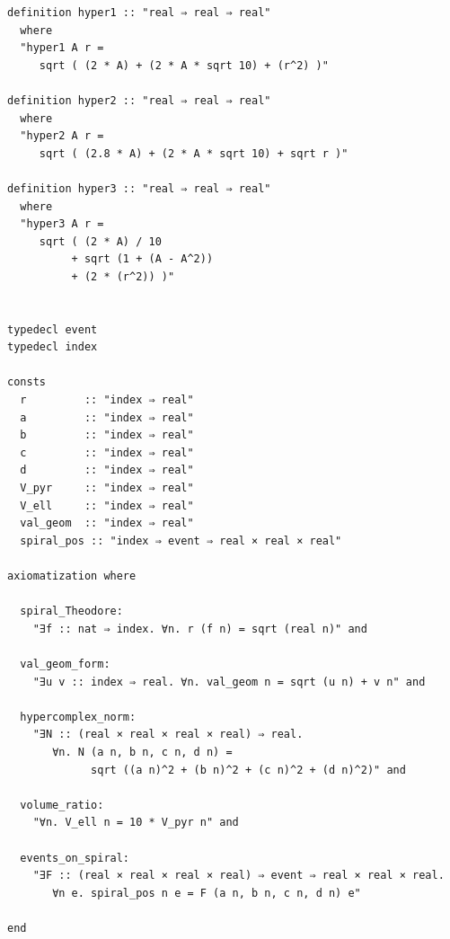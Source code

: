 \documentclass[12pt]{article}
\begin{document}
\begin{tcolorbox}[
  colback=gray!10,
  colframe=gray!50,
  arc=2mm,
  boxrule=0.5pt,
  left=4pt,
  right=4pt,
  top=6pt,
  bottom=6pt,
  enhanced
]
\begin{verbatim}
definition hyper1 :: "real ⇒ real ⇒ real"
  where
  "hyper1 A r =
     sqrt ( (2 * A) + (2 * A * sqrt 10) + (r^2) )"

definition hyper2 :: "real ⇒ real ⇒ real"
  where
  "hyper2 A r =
     sqrt ( (2.8 * A) + (2 * A * sqrt 10) + sqrt r )"

definition hyper3 :: "real ⇒ real ⇒ real"
  where
  "hyper3 A r =
     sqrt ( (2 * A) / 10
          + sqrt (1 + (A - A^2))
          + (2 * (r^2)) )"


typedecl event
typedecl index

consts
  r         :: "index ⇒ real"
  a         :: "index ⇒ real"
  b         :: "index ⇒ real"
  c         :: "index ⇒ real"
  d         :: "index ⇒ real"
  V_pyr     :: "index ⇒ real"
  V_ell     :: "index ⇒ real"
  val_geom  :: "index ⇒ real"
  spiral_pos :: "index ⇒ event ⇒ real × real × real"

axiomatization where

  spiral_Theodore:
    "∃f :: nat ⇒ index. ∀n. r (f n) = sqrt (real n)" and

  val_geom_form:
    "∃u v :: index ⇒ real. ∀n. val_geom n = sqrt (u n) + v n" and

  hypercomplex_norm:
    "∃N :: (real × real × real × real) ⇒ real.
       ∀n. N (a n, b n, c n, d n) =
             sqrt ((a n)^2 + (b n)^2 + (c n)^2 + (d n)^2)" and

  volume_ratio:
    "∀n. V_ell n = 10 * V_pyr n" and

  events_on_spiral:
    "∃F :: (real × real × real × real) ⇒ event ⇒ real × real × real.
       ∀n e. spiral_pos n e = F (a n, b n, c n, d n) e"

end
\end{verbatim}
\end{tcolorbox}
\end{document}
